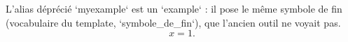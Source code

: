 \begin{myexample}
  L'alias déprécié `myexample` est un `example` : il pose le même symbole de
  fin (vocabulaire du template, `symbole_de_fin`), que l'ancien outil ne
  voyait pas.
  \[
    x = 1.
  \]
\end{myexample} %
